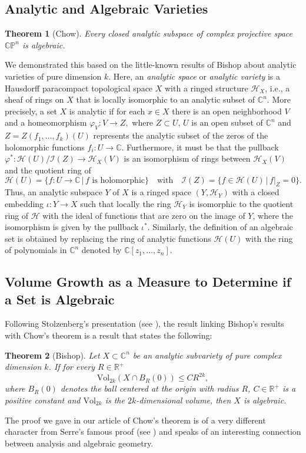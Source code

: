 \documentclass[12pt,twoside,a4paper]{report}
\newtheorem{theorem}{Theorem}[section]
\newcommand{\co}{\ensuremath{\mathbb C }}
\newcommand{\con}{\ensuremath{\mathbb{C}^n}}
\newcommand{\cp}{\ensuremath{\mathbb{CP}}}
\newcommand{\re}{\ensuremath{\mathbb R }}
\begin{document}
\subsection{Analytic and Algebraic Varieties}
\begin{theorem}[Chow]\label{Chow}
        Every closed analytic subspace of complex projective space $\cp^{n}$ is algebraic.
\end{theorem}
\noindent We demonstrated this based on the little-known results of Bishop about analytic varieties of pure dimension $k$. Here, an \emph{analytic space} or \emph{analytic variety} is a Hausdorff paracompact topological space $X$ with a ringed structure $\mathcal{H}_X$, i.e., a sheaf of rings on $X$ that is locally isomorphic to an analytic subset of $\con$. More precisely, a set $X$ is analytic if for each $x\in X$ there is an open neighborhood $V$ and a homeomorphism $\varphi_V:V\rightarrow Z,$ where $Z\subset U$, $U$ is an open subset of $\con$ and $Z=Z(f_1,\dots,f_k)(U)$ represents the analytic subset of the zeros of the holomorphic functions $f_i:U\rightarrow\co$. Furthermore, it must be that the pullback $\varphi^{*}:\mathcal{H}(U)/\mathcal{I}(Z)\rightarrow \mathcal{H}_X(V)$
is an isomorphism of rings between $\mathcal{H}_X(V)$ and the quotient ring of
\[
        \mathcal{H}(U)=\{f:U\rightarrow\co\,|\,f \text{ is holomorphic}\}\quad\text{with}\quad\mathcal{I}(Z)=\{f\in\mathcal{H}(U)\,|\,f|_{Z}=0\}.
\]
Thus, an analytic subspace $Y$ of $X$ is a ringed space $(Y,\mathcal{H}_Y)$ with a closed embedding $\iota:Y\rightarrow X$ such that locally the ring
$\mathcal{H}_Y$ is isomorphic to the quotient ring of $\mathcal{H}$ with the ideal of functions that are zero on the image of $Y$, where the isomorphism is given by the
pullback $\iota^{*}$. Similarly, the definition of an algebraic set is obtained by replacing the ring of analytic functions $\mathcal{H}(U)$ with the ring of
polynomials in $\con$ denoted by $\co[z_1,\dots,z_n]$.
\subsection{Volume Growth as a Measure to Determine if a Set is Algebraic}
\noindent Following Stolzenberg's presentation (see \cite{Stolzenberg}), the result linking
Bishop's results with Chow's theorem is a result that states the following:
\begin{theorem}[Bishop]\label{Bishop1}
        Let $X\subset\con$ be an analytic subvariety of pure complex dimension $k$. If for every $R\in\re^+$
        $$\textrm{Vol}_{2k}(X\cap B_R(0))\leq CR^{2k},$$
        where $B_R(0)$ denotes the ball centered at the origin with radius $R$, $C\in\re^{+}$ is a positive constant
        and $\textrm{Vol}_{2k}$ is the $2k$-dimensional volume, then $X$ is algebraic.
\end{theorem}
\noindent The proof we gave in our article of Chow's theorem is of a very different character from Serre's famous proof (see \cite{GAGA}) and speaks of an interesting connection between analysis and algebraic geometry.
\end{document}
